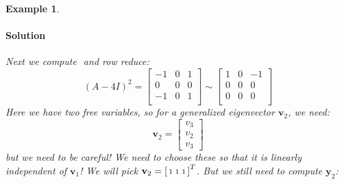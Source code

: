 \documentclass[letterpaper, 11pt, openany]{book}
\theoremstyle{mytheoremstyle}
\theoremstyle{myexamplestyle}
\newtheorem{example}{Example}[section]
\newenvironment{solution}{\paragraph{\sffamily \smaller \fontseries{b}\selectfont Solution}}{\hfill\faSquare}
\begin{document}
\begin{example}
\begin{enumerate}
\begin{solution}
            Next we compute \(\) and row reduce:
            \[(A - 4I)^2 = \left[
                \begin{array}{ccc}
                 -1 & 0 & 1 \\
                 0 & 0 & 0 \\
                 -1 & 0 & 1 \\
                \end{array}
                \right]
                \sim
                \left[
                \begin{array}{ccc}
                1 & 0 & -1 \\
                0 & 0 & 0 \\
                0 & 0 & 0 \\
                \end{array}
                \right]
                \]
            Here we have two free variables, so for a generalized eigenvector \(\mathbf{v}_2\), we need:
            \[\mathbf{v}_2 = \begin{bmatrix}
                v_3 \\ v_2 \\ v_3
            \end{bmatrix}\]
            but we need to be careful! We need to choose these so that it is linearly independent of \(\mathbf{v}_1\)! We will pick  \(\mathbf{v}_2 = \begin{bsmallmatrix}1 & 1 & 1\end{bsmallmatrix}^{T}\). But we still need to compute \(\mathbf{y}_2\):
            

\end{solution}
\end{enumerate}
\end{example}
\end{document}
